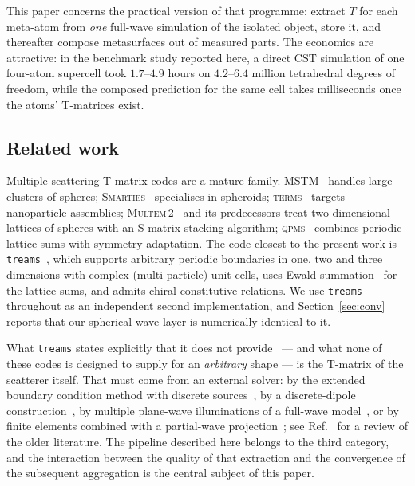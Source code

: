 \documentclass[11pt,a4paper]{article}
\theoremstyle{plain}
\theoremstyle{definition}
\begin{document}
This paper concerns the practical version of that programme: extract $T$ for each
meta-atom from \emph{one} full-wave simulation of the isolated object, store it,
and thereafter compose metasurfaces out of measured parts. The economics are
attractive: in the benchmark study reported here, a direct CST simulation of one
four-atom supercell took $1.7$--$4.9$ hours on $4.2$--$6.4$ million tetrahedral
degrees of freedom, while the composed prediction for the same cell takes
milliseconds once the atoms' T-matrices exist.

\subsection{Related work}

Multiple-scattering T-matrix codes are a mature family. \textsc{MSTM}~%
\cite{mackowski2011} handles large clusters of spheres; \textsc{Smarties}~%
\cite{somerville2016} specialises in spheroids; \textsc{terms}~%
\cite{schebarchov2022} targets nanoparticle assemblies; \textsc{Multem\,2}~%
\cite{stefanou2000} and its predecessors treat two-dimensional lattices of
spheres with an S-matrix stacking algorithm; \textsc{qpms}~\cite{necada2021}
combines periodic lattice sums with symmetry adaptation. The code closest to the
present work is \texttt{treams}~\cite{beutel2024}, which supports arbitrary
periodic boundaries in one, two and three dimensions with complex (multi-particle)
unit cells, uses Ewald summation~\cite{ewald1921,linton2010,beutel2023} for the
lattice sums, and admits chiral constitutive relations. We use \texttt{treams}
throughout as an independent second implementation, and Section~\ref{sec:conv}
reports that our spherical-wave layer is numerically identical to it.

What \texttt{treams} states explicitly that it does not
provide~\cite{beutel2024} --- and what none of these codes is designed to supply
for an \emph{arbitrary} shape --- is the T-matrix of the scatterer itself.
That must come from an external solver: by the extended boundary condition
method with discrete sources~\cite{doicu1997}, by a discrete-dipole
construction~\cite{mackowski2002}, by multiple plane-wave illuminations of a
full-wave model~\cite{fruhnert2017}, or by finite elements combined with a
partial-wave projection~\cite{demesy2018}; see Ref.~\cite{mishchenko1996} for a
review of the older literature. The pipeline described here belongs to
the third category, and the interaction between the quality of that extraction
and the convergence of the subsequent aggregation is the central subject of this
paper.
\end{document}

